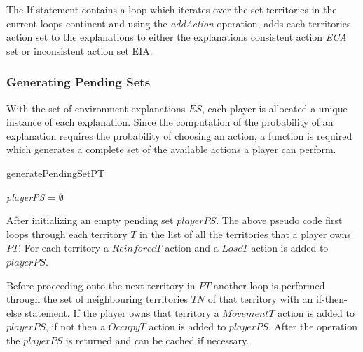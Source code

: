 \documentclass[parskip]{cs4rep}
\begin{document}
The If statement contains a loop which iterates over the set territories in the current loops continent and using the \textit{addAction} operation, adds each territories action set to the explanations to either the explanations consistent action \textit{ECA} set or inconsistent action set {EIA}.

\subsubsection{Generating Pending Sets}

With the set of environment explanations $ES$, each player is allocated a unique instance of each explanation. Since the computation of the probability of an explanation requires the probability of choosing an action, a function is required which generates a complete set of the available actions a player can perform.

\begin{pseudocode}[ruled]{generatePendingSet}{PT}
\begin{algorithm}[H]
\textit{playerPS} = $\emptyset$

\end{algorithm}
\end{pseudocode}

After initializing an empty pending set $playerPS$. The above pseudo code first loops through each territory $T$ in the list of all the territories that a player owns $PT$. For each territory a $ReinforceT$ action and a $LoseT$ action is added to $playerPS$. 

Before proceeding onto the next territory in $PT$ another loop is performed through the set of neighbouring territories $TN$ of that territory with an if-then-else statement. If the player owns that territory a $MovementT$ action is added to $playerPS$, if not then a $OccupyT$ action is added to $playerPS$. After the operation the $playerPS$ is returned and can be cached if necessary.
\end{document}
